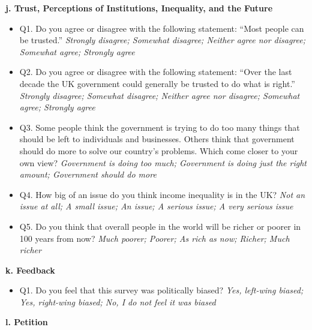 \documentclass{article}
\begin{document}
\begin{flushleft}
\textbf{j. Trust, Perceptions of Institutions, Inequality, and the Future}
\end{flushleft}

\begin{itemize}
    \item Q1. Do you agree or disagree with the following statement: ``Most people can be trusted.''
    \textit{Strongly disagree; Somewhat disagree; Neither agree nor disagree; Somewhat agree; Strongly agree}
    \item Q2. Do you agree or disagree with the following statement: ``Over the last decade the UK government could generally be trusted to do what is right.''
    \textit{Strongly disagree; Somewhat disagree; Neither agree nor disagree; Somewhat agree; Strongly agree}
    \item Q3. Some people think the government is trying to do too many things that should be left to individuals and businesses. Others think that government should do more to solve our country's problems. Which come closer to your own view?
    \textit{Government is doing too much; Government is doing just the right amount; Government should do more}
    \item Q4. How big of an issue do you think income inequality is in the UK?
    \textit{Not an issue at all; A small issue; An issue; A serious issue; A very serious issue}
    \item Q5. Do you think that overall people in the world will be richer or poorer in 100 years from now?
    \textit{Much poorer; Poorer; As rich as now; Richer; Much richer}
\end{itemize}

\begin{flushleft}
\textbf{k. Feedback}
\end{flushleft}

\begin{itemize}
    \item Q1. Do you feel that this survey was politically biased?
    \textit{Yes, left-wing biased; Yes, right-wing biased; No, I do not feel it was biased}
\end{itemize}

\begin{flushleft}
\textbf{l. Petition}
\end{flushleft}
\end{document}
